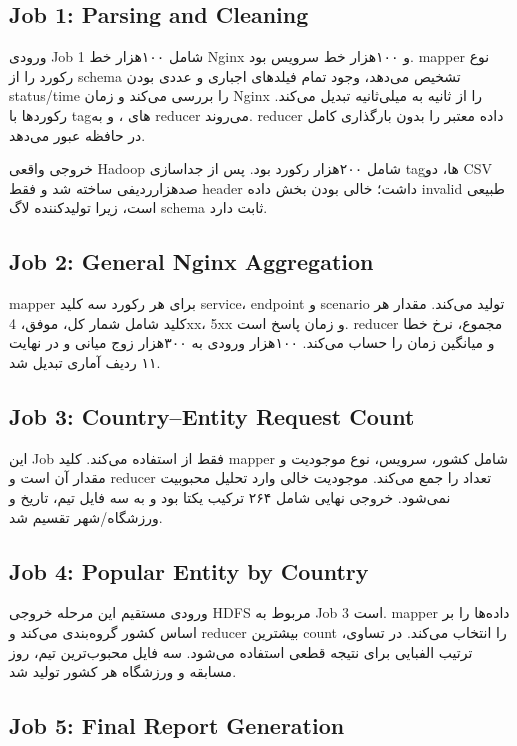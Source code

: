 \documentclass[12pt,a4paper]{article}
\begin{document}
\subsection{Job 1: Parsing and Cleaning}

ورودی Job 1 شامل ۱۰۰هزار خط Nginx و ۱۰۰هزار خط سرویس بود. mapper نوع رکورد را از schema تشخیص می‌دهد، وجود تمام فیلدهای اجباری و عددی بودن status/time را بررسی می‌کند و زمان Nginx را از ثانیه به میلی‌ثانیه تبدیل می‌کند. رکوردها با tagهای ،  و  به reducer می‌روند. reducer داده معتبر را بدون بارگذاری کامل در حافظه عبور می‌دهد.

خروجی واقعی Hadoop شامل ۲۰۰هزار رکورد بود. پس از جداسازی tagها، دو CSV صد‌هزارردیفی ساخته شد و  فقط header داشت؛ خالی بودن بخش داده invalid طبیعی است، زیرا تولیدکننده لاگ schema ثابت دارد.

\subsection{Job 2: General Nginx Aggregation}

mapper برای هر رکورد سه کلید service، endpoint و scenario تولید می‌کند. مقدار هر کلید شامل شمار کل، موفق، 4xx، 5xx و زمان پاسخ است. reducer مجموع، نرخ خطا و میانگین زمان را حساب می‌کند. ۱۰۰هزار ورودی به ۳۰۰هزار زوج میانی و در نهایت ۱۱ ردیف آماری تبدیل شد.

\subsection{Job 3: Country--Entity Request Count}

این Job فقط از  استفاده می‌کند. کلید mapper شامل کشور، سرویس، نوع موجودیت و مقدار آن است و reducer تعداد را جمع می‌کند. موجودیت خالی وارد تحلیل محبوبیت نمی‌شود. خروجی نهایی شامل ۲۶۴ ترکیب یکتا بود و به سه فایل تیم، تاریخ و ورزشگاه/شهر تقسیم شد.

\subsection{Job 4: Popular Entity by Country}

ورودی مستقیم این مرحله خروجی HDFS مربوط به Job 3 است. mapper داده‌ها را بر اساس کشور گروه‌بندی می‌کند و reducer بیشترین count را انتخاب می‌کند. در تساوی، ترتیب الفبایی برای نتیجه قطعی استفاده می‌شود. سه فایل محبوب‌ترین تیم، روز مسابقه و ورزشگاه هر کشور تولید شد.

\subsection{Job 5: Final Report Generation}
\end{document}
